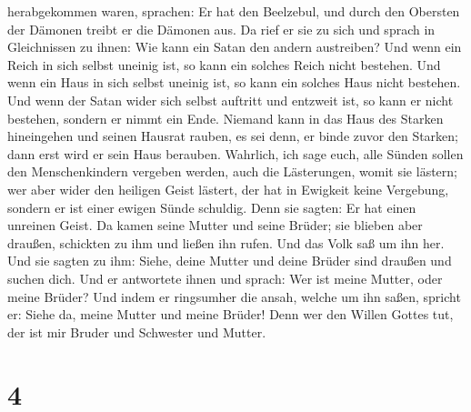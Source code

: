 herabgekommen waren, sprachen: Er hat den Beelzebul, und durch den
Obersten der Dämonen treibt er die Dämonen aus.  Da rief
er sie zu sich und sprach in Gleichnissen zu ihnen: Wie kann ein Satan
den andern austreiben?  Und wenn ein Reich in sich selbst
uneinig ist, so kann ein solches Reich nicht bestehen. 
Und wenn ein Haus in sich selbst uneinig ist, so kann ein solches Haus
nicht bestehen.  Und wenn der Satan wider sich selbst
auftritt und entzweit ist, so kann er nicht bestehen, sondern er nimmt
ein Ende.  Niemand kann in das Haus des Starken
hineingehen und seinen Hausrat rauben, es sei denn, er binde zuvor den
Starken; dann erst wird er sein Haus berauben.  Wahrlich,
ich sage euch, alle Sünden sollen den Menschenkindern vergeben werden,
auch die Lästerungen, womit sie lästern;  wer aber wider
den heiligen Geist lästert, der hat in Ewigkeit keine Vergebung, sondern
er ist einer ewigen Sünde schuldig.  Denn sie sagten: Er
hat einen unreinen Geist.  Da kamen seine Mutter und
seine Brüder; sie blieben aber draußen, schickten zu ihm und ließen ihn
rufen.  Und das Volk saß um ihn her. Und sie sagten zu
ihm: Siehe, deine Mutter und deine Brüder sind draußen und suchen dich.
 Und er antwortete ihnen und sprach: Wer ist meine
Mutter, oder meine Brüder?  Und indem er ringsumher die
ansah, welche um ihn saßen, spricht er: Siehe da, meine Mutter und meine
Brüder!  Denn wer den Willen Gottes tut, der ist mir
Bruder und Schwester und Mutter.

\hypertarget{section-3}{%
\section{4}\label{section-3}}

